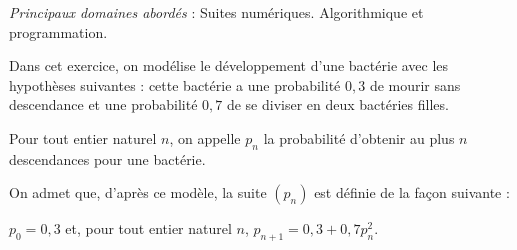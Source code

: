 \medskip

\emph{Principaux domaines abordés} : Suites numériques.
Algorithmique et programmation.

\bigskip



Dans cet exercice, on modélise le développement d'une bactérie avec les hypothèses suivantes : cette bactérie a une probabilité $0,3$ de mourir sans descendance et une probabilité $0,7$ de se diviser en deux bactéries filles.



Pour tout entier naturel $n$, on appelle $p_n$ la probabilité d'obtenir au plus $n$ descendances pour une bactérie. 

On admet que, d'après ce modèle, la suite $\left(p_n\right)$ est définie de la façon suivante :

$p_0 = 0,3$ et, pour tout entier naturel $n$, $p_{n+1} = 0,3 + 0,7p_n^2$.


